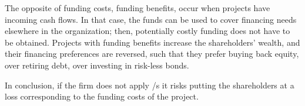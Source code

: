 \documentclass[main.tex]{subfiles}
\begin{document}
    The opposite of funding costs, funding benefits, occur when projects have incoming cash flows.
    In that case, the funds can be used to cover financing needs elsewhere in the organization;
    then, potentially costly funding does not have to be obtained.
    Projects with funding benefits increase the shareholders' wealth,
    and their financing preferences are reversed, 
    such that they prefer buying back equity, over retiring debt, over investing in risk-less bonds.

    In conclusion, if the firm does not apply \FVA/s it risks putting the shareholders at a loss
    corresponding to the funding costs of the project.
\end{document}
